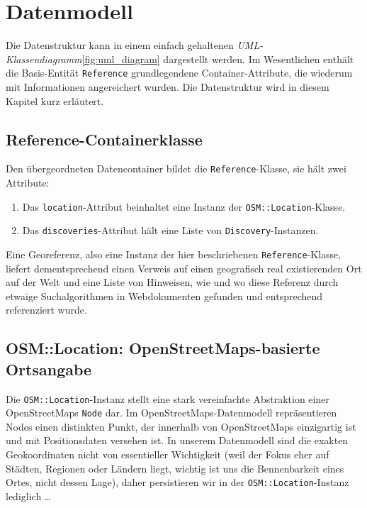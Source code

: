 \section{Datenmodell}
\label{datenmodell}

Die Datenstruktur kann in einem einfach gehaltenen \textit{UML-Klassendiagramm}\ref{fig:uml_diagram} dargestellt werden. Im Wesentlichen enthält die Basis-Entität \texttt{Reference}  grundlegendene Container-Attribute, die wiederum mit Informationen angereichert wurden. Die Datenstruktur wird in diesem Kapitel kurz erläutert.



\subsection{Reference-Containerklasse}
Den übergeordneten Datencontainer bildet die \texttt{Reference}-Klasse, sie hält zwei Attribute:

\begin{enumerate}
   \item Das \texttt{location}-Attribut beinhaltet eine Instanz der \texttt{OSM::Location}-Klasse. 
   \item Das \texttt{discoveries}-Attribut hält eine Liste von \texttt{Discovery}-Instanzen. 
\end{enumerate}

Eine Georeferenz, also eine Instanz der hier beschriebenen \texttt{Reference}-Klasse, liefert dementsprechend einen Verweis auf einen geografisch real existierenden Ort auf der Welt und eine Liste von Hinweisen, wie und wo diese Referenz durch etwaige Suchalgorithmen in Webdokumenten gefunden und entsprechend referenziert wurde.

\subsection{OSM::Location: OpenStreetMaps-basierte Ortsangabe}
Die \texttt{OSM::Location}-Instanz stellt eine stark vereinfachte Abstraktion einer OpenStreetMaps \texttt{Node}\cite{OSMnode} dar. Im OpenStreetMaps-Datenmodell repräsentieren Nodes einen distinkten Punkt, der innerhalb von OpenStreetMaps einzigartig ist und mit Positionsdaten versehen ist. In unserem Datenmodell sind die exakten Geokoordinaten nicht von essentieller Wichtigkeit (weil der Fokus eher auf Städten, Regionen oder Ländern liegt, wichtig ist uns die Bennenbarkeit eines Ortes, nicht dessen Lage), daher persistieren wir in der \texttt{OSM::Location}-Instanz lediglich \ldots

